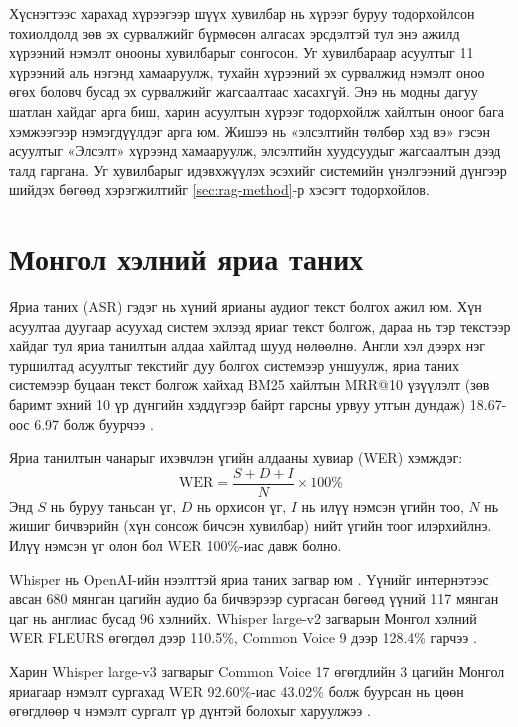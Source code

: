 Хүснэгтээс харахад хүрээгээр шүүх хувилбар нь хүрээг буруу тодорхойлсон тохиолдолд зөв эх сурвалжийг бүрмөсөн алгасах эрсдэлтэй тул энэ ажилд хүрээний нэмэлт онооны хувилбарыг сонгосон. Уг хувилбараар асуултыг 11 хүрээний аль нэгэнд хамааруулж, тухайн хүрээний эх сурвалжид нэмэлт оноо өгөх боловч бусад эх сурвалжийг жагсаалтаас хасахгүй. Энэ нь модны дагуу шатлан хайдаг арга биш, харин асуултын хүрээг тодорхойлж хайлтын оноог бага хэмжээгээр нэмэгдүүлдэг арга юм. Жишээ нь «элсэлтийн төлбөр хэд вэ» гэсэн асуултыг «Элсэлт» хүрээнд хамааруулж, элсэлтийн хуудсуудыг жагсаалтын дээд талд гаргана. Уг хувилбарыг идэвхжүүлэх эсэхийг системийн үнэлгээний дүнгээр шийдэх бөгөөд хэрэгжилтийг \ref{sec:rag-method}-р хэсэгт тодорхойлов.

\section{Монгол хэлний яриа таних}
\label{sec:lit-asr}

Яриа таних (\acs{ASR}) гэдэг нь хүний ярианы аудиог текст болгох ажил юм. Хүн асуултаа дуугаар асуухад систем эхлээд яриаг текст болгож, дараа нь тэр текстээр хайдаг тул яриа танилтын алдаа хайлтад шууд нөлөөлнө. Англи хэл дээрх нэг туршилтад асуултыг текстийг дуу болгох системээр уншуулж, яриа таних системээр буцаан текст болгож хайхад BM25 хайлтын \acs{MRR}@10 үзүүлэлт (зөв баримт эхний 10 үр дүнгийн хэддүгээр байрт гарсны урвуу утгын дундаж) 18.67-оос 6.97 болж буурчээ \cite{sidiropoulos2022asr}.

Яриа танилтын чанарыг ихэвчлэн үгийн алдааны хувиар (\acs{WER}) хэмждэг:
\begin{equation}
\mathrm{WER} = \frac{S + D + I}{N} \times 100\%
\label{eq:wer}
\end{equation}
Энд $S$ нь буруу таньсан үг, $D$ нь орхисон үг, $I$ нь илүү нэмсэн үгийн тоо, $N$ нь жишиг бичвэрийн (хүн сонсож бичсэн хувилбар) нийт үгийн тоог илэрхийлнэ. Илүү нэмсэн үг олон бол \acs{WER} 100\%-иас давж болно.

Whisper нь OpenAI-ийн нээлттэй яриа таних загвар юм \cite{radford2023whisper}. Үүнийг интернэтээс авсан 680 мянган цагийн аудио ба бичвэрээр сургасан бөгөөд үүний 117 мянган цаг нь англиас бусад 96 хэлнийх. Whisper large-v2 загварын Монгол хэлний \acs{WER} FLEURS өгөгдөл дээр 110.5\%, Common Voice 9 дээр 128.4\% гарчээ \cite{radford2023whisper}. %

Харин Whisper large-v3 загварыг Common Voice 17 өгөгдлийн 3 цагийн Монгол яриагаар нэмэлт сургахад \acs{WER} 92.60\%-иас 43.02\% болж буурсан нь цөөн өгөгдлөөр ч нэмэлт сургалт үр дүнтэй болохыг харуулжээ \cite{mengke2025khalkha}.

